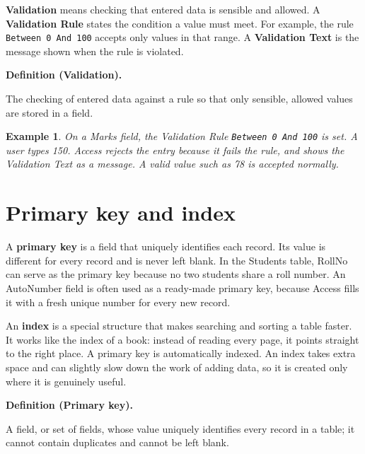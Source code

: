 \documentclass[11pt]{article}
\newtheorem{example}{Example}[section]
\newenvironment{definitionbox}[1]{%
  \par\noindent\textbf{Definition (#1).}\ \itshape
}{\par\vspace{0.3em}}
\begin{document}
\textbf{Validation} means checking that entered data is sensible and allowed.
A \textbf{Validation Rule} states the condition a value must meet. For
example, the rule \texttt{Between 0 And 100} accepts only values in that
range. A \textbf{Validation Text} is the message shown when the rule is
violated.

\begin{definitionbox}{Validation}
The checking of entered data against a rule so that only sensible, allowed
values are stored in a field.
\end{definitionbox}

\begin{example}
On a Marks field, the Validation Rule \texttt{Between 0 And 100} is set. A
user types 150. Access rejects the entry because it fails the rule, and shows
the Validation Text as a message. A valid value such as 78 is accepted
normally.
\end{example}

\section{Primary key and index}
A \textbf{primary key} is a field that uniquely identifies each record. Its
value is different for every record and is never left blank. In the Students
table, RollNo can serve as the primary key because no two students share a
roll number. An AutoNumber field is often used as a ready-made primary key,
because Access fills it with a fresh unique number for every new record.

An \textbf{index} is a special structure that makes searching and sorting a
table faster. It works like the index of a book: instead of reading every
page, it points straight to the right place. A primary key is automatically
indexed. An index takes extra space and can slightly slow down the work of
adding data, so it is created only where it is genuinely useful.

\begin{definitionbox}{Primary key}
A field, or set of fields, whose value uniquely identifies every record in a
table; it cannot contain duplicates and cannot be left blank.
\end{definitionbox}
\end{document}
